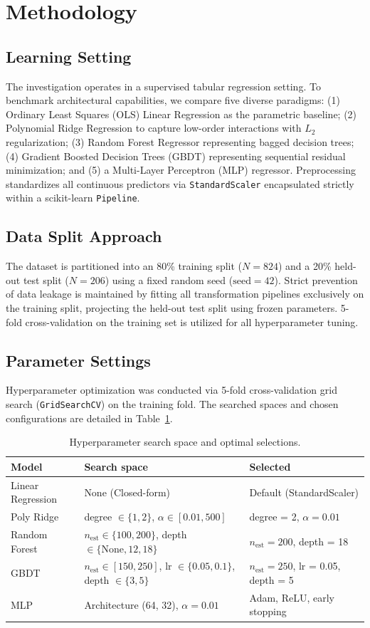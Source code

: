 \documentclass[10pt,conference,a4paper]{IEEEtran}
\begin{document}
\section{Methodology}
\subsection{Learning Setting}
The investigation operates in a supervised tabular regression setting. To benchmark architectural capabilities, we compare five diverse paradigms: (1) Ordinary Least Squares (OLS) Linear Regression as the parametric baseline; (2) Polynomial Ridge Regression to capture low-order interactions with $L_2$ regularization; (3) Random Forest Regressor representing bagged decision trees; (4) Gradient Boosted Decision Trees (GBDT) representing sequential residual minimization; and (5) a Multi-Layer Perceptron (MLP) regressor. Preprocessing standardizes all continuous predictors via \texttt{StandardScaler} encapsulated strictly within a scikit-learn \texttt{Pipeline}.

\subsection{Data Split Approach}
The dataset is partitioned into an 80\% training split ($N = 824$) and a 20\% held-out test split ($N = 206$) using a fixed random seed ($\text{seed} = 42$). Strict prevention of data leakage is maintained by fitting all transformation pipelines exclusively on the training split, projecting the held-out test split using frozen parameters. 5-fold cross-validation on the training set is utilized for all hyperparameter tuning.

\subsection{Parameter Settings}
Hyperparameter optimization was conducted via 5-fold cross-validation grid search (\texttt{GridSearchCV}) on the training fold. The searched spaces and chosen configurations are detailed in Table~\ref{tab:hyperparams}.

\begin{table}[htbp]
\centering
\caption{Hyperparameter search space and optimal selections.}
\label{tab:hyperparams}
\begin{tabular}{lll}
\toprule
\textbf{Model} & \textbf{Search space} & \textbf{Selected} \\
\midrule
Linear Regression & None (Closed-form) & Default (StandardScaler) \\
Poly Ridge & degree $\in \{1, 2\}$, $\alpha \in [0.01, 500]$ & degree = 2, $\alpha = 0.01$ \\
Random Forest & $n_{\text{est}} \in \{100, 200\}$, depth $\in \{\text{None}, 12, 18\}$ & $n_{\text{est}} = 200$, depth = 18 \\
GBDT & $n_{\text{est}} \in [150, 250]$, lr $\in \{0.05, 0.1\}$, depth $\in \{3, 5\}$ & $n_{\text{est}} = 250$, lr = 0.05, depth = 5 \\
MLP & Architecture (64, 32), $\alpha = 0.01$ & Adam, ReLU, early stopping \\
\bottomrule
\end{tabular}
\end{table}
\end{document}
